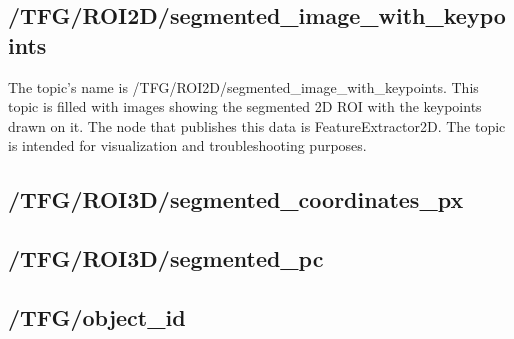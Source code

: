 \subsection{/TFG/ROI2D/segmented\_image\_with\_keypoints}
The topic's name is /TFG/ROI2D/segmented\_image\_with\_keypoints. This topic is filled with images showing the segmented 2D ROI with the keypoints drawn on it. The node that publishes this data is FeatureExtractor2D. The topic is intended for visualization and troubleshooting purposes. 

\subsection{/TFG/ROI3D/segmented\_coordinates\_px}
\subsection{/TFG/ROI3D/segmented\_pc}
\subsection{/TFG/object\_id}